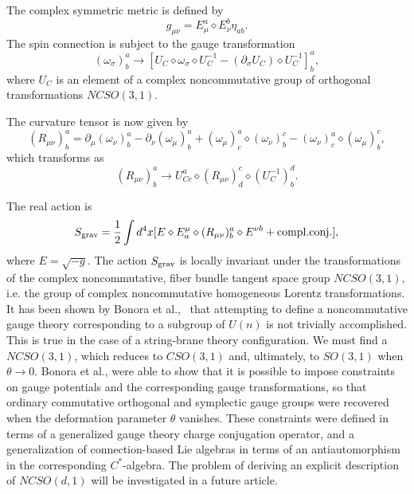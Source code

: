 \documentclass[a4paper,10pt]{article}
\begin{document}
The complex symmetric metric is defined by
\begin{equation}
g_{\mu\nu}=E^a_\mu\diamond E^b_\nu\eta_{ab}.
\end{equation}
The spin connection is subject to the gauge
transformation
\begin{equation}
(\omega_\sigma)^a_b\rightarrow[U_C\diamond\omega_\sigma\diamond
U_C^{-1}-(\partial_\sigma U_C)\diamond U_C^{-1}]^a_b,
\end{equation}
where $U_C$ is an element of a complex noncommutative group of
orthogonal transformations $NCSO(3,1)$.

The curvature tensor is now given by
\begin{equation}
(R_{\mu\nu})^a_b=\partial_\mu(\omega_\nu)^a_b-\partial_\nu(\omega_\mu)^a_b
+(\omega_\mu)^a_c\diamond(\omega_\nu)^c_b-(\omega_\nu)^a_c\diamond
(\omega_\mu)^c_b,
\end{equation}
which transforms as
\begin{equation}
(R_{\mu\nu})^a_b\rightarrow
U^a_{Cc}\diamond(R_{\mu\nu})^c_d\diamond(U_C^{-1})^d_b.
\end{equation}

The real action is
\begin{equation}
S_{\rm grav}=\frac{1}{2}\int d^4x[E\diamond E^\mu_a\diamond
(R_{\mu\nu})^a_b\diamond E^{\nu b} + {\rm compl. conj.}],
\end{equation}
where $E=\sqrt{-g}$.  The action $S_{\rm grav}$ is locally invariant under the
transformations of the complex noncommutative, fiber bundle tangent space
group $NCSO(3,1)$, i.e. the group of complex noncommutative homogeneous
Lorentz transformations. It has been shown by Bonora et al.,~\cite{Bonora}
that attempting to define a noncommutative gauge theory corresponding to a
subgroup of $U(n)$ is not trivially accomplished. This is
true in the case of a string-brane theory configuration. We must find a
$NCSO(3,1)$, which reduces to $CSO(3,1)$ and, ultimately, to $SO(3,1)$
when $\theta\rightarrow 0$. Bonora et al., were able to show that it is
possible to impose constraints on gauge potentials and the corresponding
gauge transformations, so that ordinary commutative orthogonal and
symplectic gauge groups were recovered when the deformation parameter
$\theta$ vanishes. These constraints were defined in terms of a generalized
gauge theory charge conjugation operator, and a generalization of
connection-based Lie algebras in terms of an antiautomorphism in the
corresponding $C^*$-algebra. The problem of deriving an
explicit description of $NCSO(d,1)$ will be investigated in a future
article.
\end{document}
